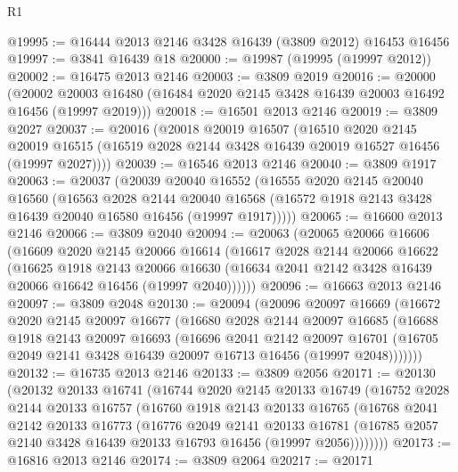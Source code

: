 \begin{lexlean}{R1}
\begin{coremodule}
@19995 := @16444 @2013 @2146 @3428 @16439 (@3809 @2012) @16453 @16456
@19997 := @3841 @16439 @18
@20000 := @19987 (@19995 (@19997 @2012))
@20002 := @16475 @2013 @2146
@20003 := @3809 @2019
@20016 := @20000
    (@20002 @20003 @16480 (@16484 @2020 @2145 @3428 @16439 @20003 @16492 @16456 (@19997 @2019)))
@20018 := @16501 @2013 @2146
@20019 := @3809 @2027
@20037 := @20016
    (@20018
      @20019
      @16507
      (@16510
        @2020
        @2145
        @20019
        @16515
        (@16519 @2028 @2144 @3428 @16439 @20019 @16527 @16456 (@19997 @2027))))
@20039 := @16546 @2013 @2146
@20040 := @3809 @1917
@20063 := @20037
    (@20039
      @20040
      @16552
      (@16555
        @2020
        @2145
        @20040
        @16560
        (@16563
          @2028
          @2144
          @20040
          @16568
          (@16572 @1918 @2143 @3428 @16439 @20040 @16580 @16456 (@19997 @1917)))))
@20065 := @16600 @2013 @2146
@20066 := @3809 @2040
@20094 := @20063
    (@20065
      @20066
      @16606
      (@16609
        @2020
        @2145
        @20066
        @16614
        (@16617
          @2028
          @2144
          @20066
          @16622
          (@16625
            @1918
            @2143
            @20066
            @16630
            (@16634 @2041 @2142 @3428 @16439 @20066 @16642 @16456 (@19997 @2040))))))
@20096 := @16663 @2013 @2146
@20097 := @3809 @2048
@20130 := @20094
    (@20096
      @20097
      @16669
      (@16672
        @2020
        @2145
        @20097
        @16677
        (@16680
          @2028
          @2144
          @20097
          @16685
          (@16688
            @1918
            @2143
            @20097
            @16693
            (@16696
              @2041
              @2142
              @20097
              @16701
              (@16705 @2049 @2141 @3428 @16439 @20097 @16713 @16456 (@19997 @2048)))))))
@20132 := @16735 @2013 @2146
@20133 := @3809 @2056
@20171 := @20130
    (@20132
      @20133
      @16741
      (@16744
        @2020
        @2145
        @20133
        @16749
        (@16752
          @2028
          @2144
          @20133
          @16757
          (@16760
            @1918
            @2143
            @20133
            @16765
            (@16768
              @2041
              @2142
              @20133
              @16773
              (@16776
                @2049
                @2141
                @20133
                @16781
                (@16785 @2057 @2140 @3428 @16439 @20133 @16793 @16456 (@19997 @2056))))))))
@20173 := @16816 @2013 @2146
@20174 := @3809 @2064
@20217 := @20171

\end{coremodule}
\end{lexlean}
